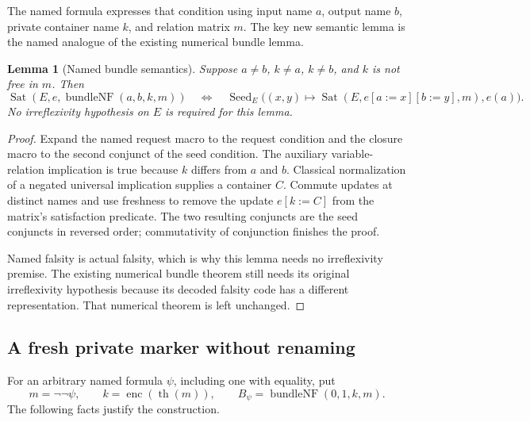 \documentclass[11pt,letterpaper]{article}
\newtheorem{lemma}[theorem]{Lemma}
\newcommand{\Sat}{\operatorname{Sat}}
\newcommand{\enc}{\operatorname{enc}}
\newcommand{\thh}{\operatorname{th}}
\newcommand{\Seed}{\operatorname{Seed}}
\newcommand{\code}[1]{\texttt{\detokenize{#1}}}
\begin{document}
The named formula \code{bundleNF a b k m} expresses that condition using input
name $a$, output name $b$, private container name $k$, and relation matrix $m$.
The key new semantic lemma is the named analogue of the existing numerical
bundle lemma.

\begin{lemma}[Named bundle semantics]
Suppose $a\ne b$, $k\ne a$, $k\ne b$, and $k$ is not free in $m$. Then
\[
 \Sat(E,e,\operatorname{bundleNF}(a,b,k,m))
 \quad\Longleftrightarrow\quad
 \Seed_E\bigl((x,y)\mapsto\Sat(E,e[a:=x][b:=y],m),e(a)\bigr).
\]
No irreflexivity hypothesis on $E$ is required for this lemma.
\end{lemma}
\begin{proof}
Expand the named request macro to the request condition and the closure macro
to the second conjunct of the seed condition. The auxiliary variable-relation
implication is true because $k$ differs from $a$ and $b$. Classical normalization
of a negated universal implication supplies a container $C$. Commute updates
at distinct names and use freshness to remove the update $e[k:=C]$ from the
matrix's satisfaction predicate. The two resulting conjuncts are the seed
conjuncts in reversed order; commutativity of conjunction finishes the proof.

Named falsity is actual falsity, which is why this lemma needs no irreflexivity
premise. The existing numerical bundle theorem still needs its original
irreflexivity hypothesis because its decoded falsity code has a different
representation. That numerical theorem is left unchanged.
\end{proof}

\subsection{A fresh private marker without renaming}

For an arbitrary named formula $\psi$, including one with equality, put
\[
 m=\neg\neg\psi,\qquad k=\enc(\thh(m)),\qquad
 B_\psi=\operatorname{bundleNF}(0,1,k,m).
\]
The following facts justify the construction.
\end{document}
